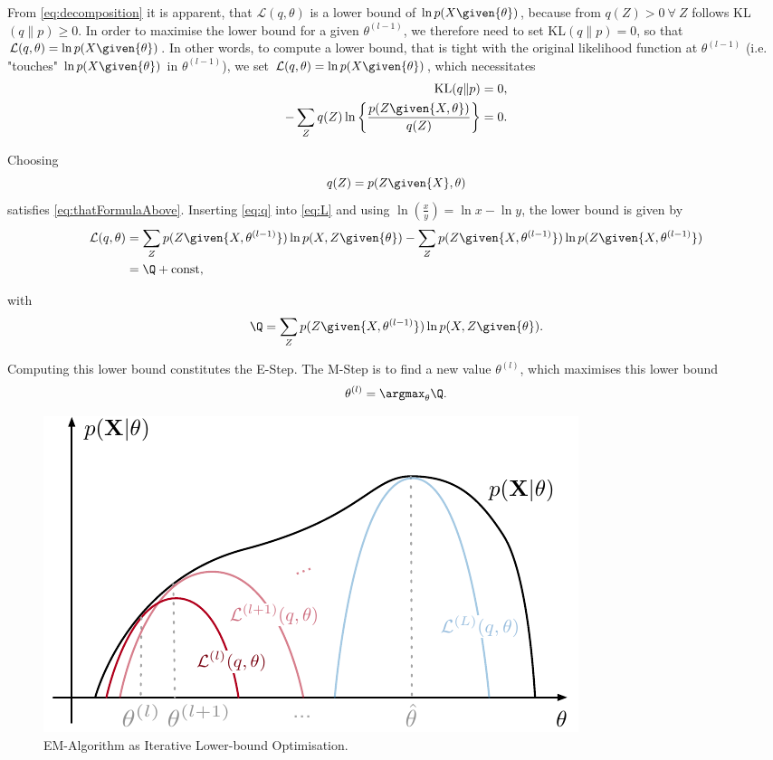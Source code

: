 From \eqref{eq:decomposition} it is apparent, that $\mathcal{L}(q,\theta)$ is a lower bound of $\ln p(X\given{\theta})$, because from $q(Z)>0\ \forall\ Z$ follows KL$(q\|p)\geq0$. In order to maximise the lower bound for a given $\theta^{(l-1)}$, we therefore need to set KL$(q\|p)=0$, so that $\mathcal{L}(q,\theta)=\ln p(X\given{\theta})$. In other words, to compute a lower bound, that is tight with the original likelihood function at $\theta^{(l-1)}$ (i.e. "touches" $\ln p(X\given{\theta})$ in $\theta^{(l-1)}$), we set $\mathcal{L}(q,\theta)=\ln p(X\given{\theta})$, which necessitates
\begin{align}
\label{eq:thatOtherFormulaAbove}
    \text{KL}(q\|p)&=0,\\
    -\sum_{Z}q(Z)\ln\left\{\frac{p(Z\given{X,\theta})}{q(Z)} \right\}&=0.
\label{eq:thatFormulaAbove}
\end{align}

Choosing
\begin{equation}
    q(Z)=p(Z\given{X},\theta)
\label{eq:q}
\end{equation}
satisfies \eqref{eq:thatFormulaAbove}. Inserting \eqref{eq:q} into \eqref{eq:L} and using $\ln(\frac{x}{y})=\ln{x}-\ln{y}$, the lower bound is given by
\begin{align}
    \mathcal{L}(q, \theta)&=\sum_{Z}p(Z\given{X, \theta^{(l-1)}})\ln p(X,Z\given{\theta})-\sum_{Z}p(Z\given{X, \theta^{(l-1)}})\ln p(Z\given{X,\theta^{(l-1)}})\\
    &=\Q+\text{const},
\end{align}

with
\begin{equation}
\label{eq:e-step}
    \Q=\sum_{Z}p(Z\given{X, \theta^{(l-1)}})\ln p(X,Z\given{\theta}).
\end{equation}
    
Computing this lower bound constitutes the E-Step. The M-Step is to find a new value $\theta^{(l)}$, which maximises this lower bound
\begin{equation}
\label{eq:m-step}
    \theta^{(l)} = \argmax_{\theta}\Q.
\end{equation}

\begin{figure}[!hb]
    \centering
    \includegraphics[scale=1]{data/figures/em-Q4}
    \caption[EM-Algorithm as Iterative Lower-bound Optimisation]{EM-Algorithm as Iterative Lower-bound Optimisation.}
    \label{fig:em}
\end{figure}

